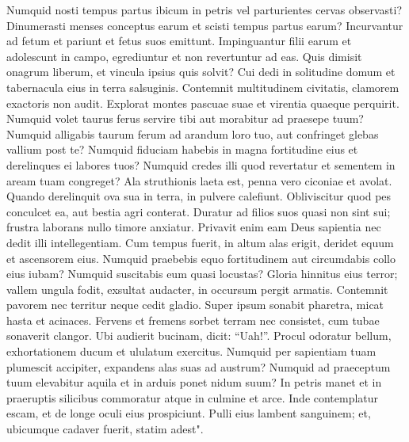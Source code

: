 \begin{biblechapter}  
\verse Numquid nosti tempus partus ibicum in petris vel parturientes cervas observasti? 
\verse Dinumerasti menses conceptus earum et scisti tempus partus earum? 
\verse Incurvantur ad fetum et pariunt et fetus suos emittunt. 
\verse Impinguantur filii earum et adolescunt in campo, egrediuntur et non revertuntur ad eas. 
\verse Quis dimisit onagrum liberum, et vincula ipsius quis solvit? 
\verse Cui dedi in solitudine domum et tabernacula eius in terra salsuginis. 
\verse Contemnit multitudinem civitatis, clamorem exactoris non audit. 
\verse Explorat montes pascuae suae et virentia quaeque perquirit. 
\verse Numquid volet taurus ferus servire tibi aut morabitur ad praesepe tuum? 
\verse Numquid alligabis taurum ferum ad arandum loro tuo, aut confringet glebas vallium post te? 
\verse Numquid fiduciam habebis in magna fortitudine eius et derelinques ei labores tuos? 
\verse Numquid credes illi quod revertatur et sementem in aream tuam congreget? 
\verse Ala struthionis laeta est, penna vero ciconiae et avolat. 
\verse Quando derelinquit ova sua in terra, in pulvere calefiunt. 
\verse Obliviscitur quod pes conculcet ea, aut bestia agri conterat. 
\verse Duratur ad filios suos quasi non sint sui; frustra laborans nullo timore anxiatur. 
\verse Privavit enim eam Deus sapientia nec dedit illi intellegentiam. 
\verse Cum tempus fuerit, in altum alas erigit, deridet equum et ascensorem eius. 
\verse Numquid praebebis equo fortitudinem aut circumdabis collo eius iubam? 
\verse Numquid suscitabis eum quasi locustas? Gloria hinnitus eius terror; 
\verse vallem ungula fodit, exsultat audacter, in occursum pergit armatis. 
\verse Contemnit pavorem nec territur neque cedit gladio. 
\verse Super ipsum sonabit pharetra, micat hasta et acinaces. 
\verse Fervens et fremens sorbet terram nec consistet, cum tubae sonaverit clangor. 
\verse Ubi audierit bucinam, dicit: “Uah!”. Procul odoratur bellum, exhortationem ducum et ululatum exercitus. 
\verse Numquid per sapientiam tuam plumescit accipiter, expandens alas suas ad austrum? 
\verse Numquid ad praeceptum tuum elevabitur aquila et in arduis ponet nidum suum? 
\verse In petris manet et in praeruptis silicibus commoratur atque in culmine et arce. 
\verse Inde contemplatur escam, et de longe oculi eius prospiciunt. 
\verse Pulli eius lambent sanguinem; et, ubicumque cadaver fuerit, statim adest". 
\end{biblechapter}

